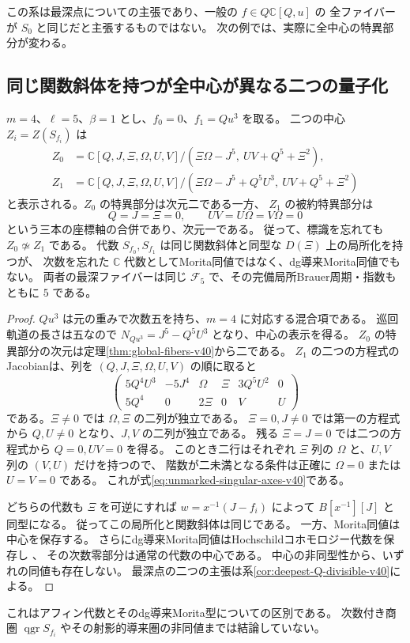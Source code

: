 この系は最深点についての主張であり、一般の $f\in Q\mathbb C[Q,u]$ の
全ファイバーが $S_0$ と同じだと主張するものではない。
次の例では、実際に全中心の特異部分が変わる。

\subsection{同じ関数斜体を持つが全中心が異なる二つの量子化}

\begin{proposition}[標識を忘れた全中心の非同型性]
\label{prop:unmarked-global-centers-v40}
$m=4$、$\ell=5$、$\beta=1$ とし、$f_0=0$、$f_1=Qu^3$ を取る。
二つの中心 $Z_i=Z(S_{f_i})$ は
\begin{align*}
 Z_0&=\mathbb C[Q,J,\Xi,\Omega,U,V]/
       (\Xi\Omega-J^5,\ UV+Q^5+\Xi^2),\\
 Z_1&=\mathbb C[Q,J,\Xi,\Omega,U,V]/
       (\Xi\Omega-J^5+Q^5U^3,\ UV+Q^5+\Xi^2)
\end{align*}
と表示される。$Z_0$ の特異部分は次元二である一方、
$Z_1$ の被約特異部分は
\begin{equation}\label{eq:unmarked-singular-axes-v40}
 Q=J=\Xi=0,\qquad UV=U\Omega=V\Omega=0
\end{equation}
という三本の座標軸の合併であり、次元一である。
従って、標識を忘れても $Z_0\not\simeq Z_1$ である。
代数 $S_{f_0},S_{f_1}$ は同じ関数斜体と同型な $D(\Xi)$ 上の局所化を持つが、
次数を忘れた $\mathbb C$ 代数としてMorita同値ではなく、dg導来Morita同値でもない。
両者の最深ファイバーは同じ $\mathcal F_5$ で、その完備局所Brauer周期・指数もともに $5$ である。
\end{proposition}

\begin{proof}
$Qu^3$ は元の重みで次数五を持ち、$m=4$ に対応する混合項である。
巡回軌道の長さは五なので $N_{Qu^3}=J^5-Q^5U^3$ となり、中心の表示を得る。
$Z_0$ の特異部分の次元は定理\ref{thm:global-fibers-v40}から二である。
$Z_1$ の二つの方程式のJacobianは、列を $(Q,J,\Xi,\Omega,U,V)$ の順に取ると
\[
 \begin{pmatrix}
 5Q^4U^3&-5J^4&\Omega&\Xi&3Q^5U^2&0\\
 5Q^4&0&2\Xi&0&V&U
 \end{pmatrix}
\]
である。$\Xi\ne0$ では $\Omega,\Xi$ の二列が独立である。
$\Xi=0,J\ne0$ では第一の方程式から $Q,U\ne0$ となり、$J,V$ の二列が独立である。
残る $\Xi=J=0$ では二つの方程式から $Q=0,UV=0$ を得る。
このとき二行はそれぞれ $\Xi$ 列の $\Omega$ と、$U,V$ 列の $(V,U)$ だけを持つので、
階数が二未満となる条件は正確に $\Omega=0$ または $U=V=0$ である。
これが式\eqref{eq:unmarked-singular-axes-v40}である。

どちらの代数も $\Xi$ を可逆にすれば
$w=x^{-1}(J-f_i)$ によって $B[x^{-1}][J]$ と同型になる。
従ってこの局所化と関数斜体は同じである。
一方、Morita同値は中心を保存する。
さらにdg導来Morita同値はHochschildコホモロジー代数を保存し
\cite[Theorem~3.2 and its corollary]{KellerDerived2003}、
その次数零部分は通常の代数の中心である。
中心の非同型性から、いずれの同値も存在しない。
最深点の二つの主張は系\ref{cor:deepest-Q-divisible-v40}による。
\end{proof}

これはアフィン代数とそのdg導来Morita型についての区別である。
次数付き商圏 $\operatorname{qgr}S_{f_i}$ やその射影的導来圏の非同値までは結論していない。
